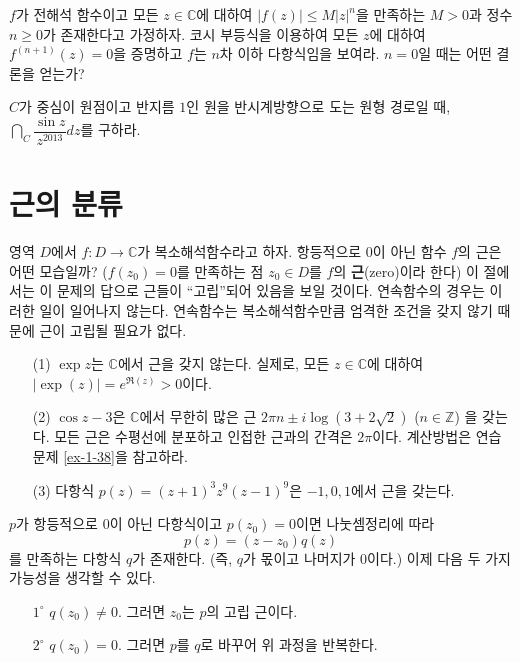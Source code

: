 \begin{salt_exercise} \label{ex-4-15}
$f$가 전해석 함수이고 모든 $z\in\mathbb C$에 대하여
$|f(z)| \le M|z|^n$을 만족하는  $M>0$과 정수 $n\ge0$가 존재한다고 가정하자.
코시 부등식을 이용하여 모든 $z$에 대하여 $f^{(n+1)}(z) = 0$을 증명하고
$f$는 $n$차 이하 다항식임을 보여라. $n=0$일 때는 어떤 결론을 얻는가?
\end{salt_exercise}

\begin{salt_exercise} \label{ex-4-16}
$C$가 중심이 원점이고 반지름 $1$인 원을 반시계방향으로 도는 원형 경로일 때,
$\dint_C \dfrac{\sin z}{z^{2013}}dz$를 구하라.
\end{salt_exercise}

\section{근의 분류}

영역 $D$에서  $f: D\to \mathbb C$가 복소해석함수라고 하자.
항등적으로 $0$이 아닌 함수 $f$의 근은 어떤 모습일까?
($f(z_0)=0$를 만족하는 점 $z_0\in D$를 $f$의 {\bf 근}(zero)이라 한다)
이 절에서는 이 문제의 답으로 근들이 ``고립''되어 있음을 보일 것이다.
연속함수의 경우는 이러한 일이 일어나지 않는다. 
연속함수는 복소해석함수만큼 엄격한 조건을 갖지 않기 때문에
근이 고립될 필요가 없다.

\begin{saltexample}[label=example-4-5]{}{}
\begin{itemize}
\item[(1)] $\exp z$는 $\mathbb C$에서 근을 갖지 않는다.
실제로, 모든 $z\in \mathbb C$에 대하여 $|\exp(z)| = e^{\Re(z)} >0$이다.
\item[(2)] $\cos z - 3$은 $\mathbb C$에서 무한히 많은 근 
$2\pi n \pm i \log(3+2\sqrt{2})$ ($n\in\mathbb Z$)
을 갖는다.
모든 근은 수평선에 분포하고 인접한 근과의 간격은 $2\pi$이다.
계산방법은 연습문제 \ref{ex-1-38}을 참고하라.
\item[(3)] 다항식 $p(z) = (z+1)^3z^9(z-1)^9$은 $-1, 0, 1$에서 근을 갖는다. 
\end{itemize}
\end{saltexample}

$p$가 항등적으로 $0$이 아닌 다항식이고 $p(z_0)=0$이면
나눗셈정리에 따라 
\[
p(z) = (z-z_0) q(z)
\]
를 만족하는 다항식 $q$가 존재한다.
(즉, $q$가 몫이고 나머지가 $0$이다.)
이제 다음 두 가지  가능성을 생각할 수 있다.
\begin{itemize}
\item[$1^\circ$] $q(z_0) \ne0$. 그러면 $z_0$는 $p$의 고립 근이다.
\item[$2^\circ$] $q(z_0) =0$. 그러면 $p$를 $q$로 바꾸어 위 과정을 반복한다.
\end{itemize}

